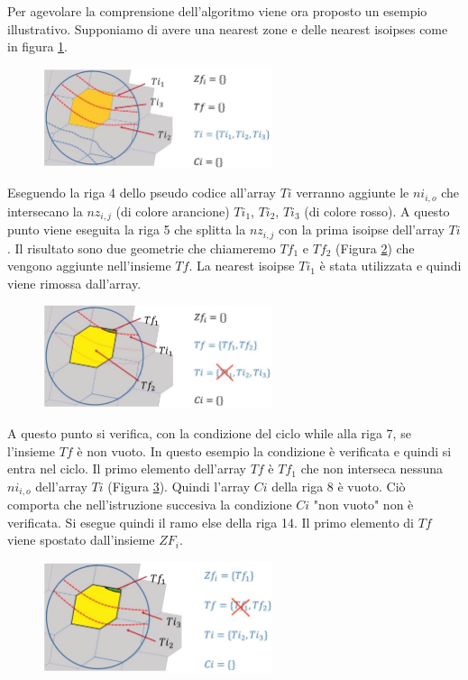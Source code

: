 Per agevolare la comprensione dell'algoritmo viene ora proposto un esempio 
illustrativo. Supponiamo di avere una nearest zone e delle nearest isoipses come in figura \ref{pseudo1}. 

\begin{figure}[h]
	\centering
	\includegraphics[width=0.6\textwidth]{images/pseudo1}
	\caption{}
	\label{pseudo1}
\end{figure}

Eseguendo la riga 4 dello pseudo codice  all'array $Ti$ verranno aggiunte le $ni_{i,o}$ che intersecano la $nz_{i,j}$ (di colore arancione) $Ti_1$, $Ti_2$, $Ti_3$ (di colore rosso). 
A questo punto viene eseguita la riga 5 che splitta la $nz_{i,j}$ con la prima isoipse dell'array $Ti$. Il risultato sono due geometrie che chiameremo $Tf_1$ e $Tf_2$ (Figura \ref{pseudo2}) che vengono aggiunte nell'insieme $Tf$. La nearest isoipse $Ti_1$ è stata utilizzata e quindi viene rimossa dall'array.
	
\begin{figure}[h]
	\centering
	\includegraphics[width=0.6\textwidth]{images/pseudo2}
	\caption{}
	\label{pseudo2}
\end{figure}

A questo punto si verifica, con la condizione del ciclo while alla riga 7, se l'insieme $Tf$ è non vuoto. In questo esempio la condizione è verificata e quindi si entra nel ciclo. Il primo elemento dell'array $Tf$ è $Tf_1$ che non interseca nessuna $ni_{i,o}$ dell'array $Ti$ (Figura \ref{pseudo3}). Quindi l'array $Ci$ della riga 8 è vuoto. Ciò comporta che nell'istruzione succesiva la condizione $Ci$ "non vuoto" non è verificata. Si esegue quindi il ramo else della riga 14. Il primo elemento di $Tf$ viene spostato dall'insieme $ZF_i$.

\begin{figure}[h]
	\centering
	\includegraphics[width=0.6\textwidth]{images/pseudo3}
	\caption{}
	\label{pseudo3}
\end{figure}

